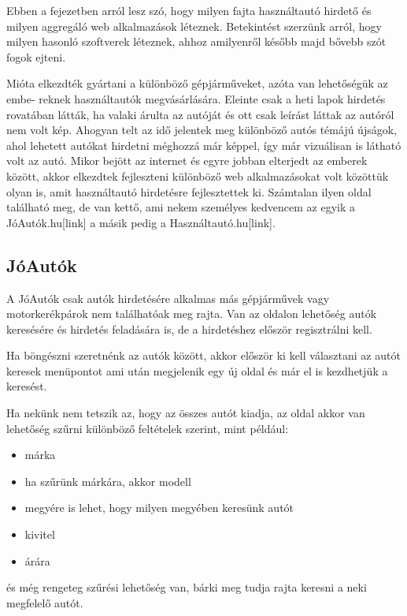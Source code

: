 
Ebben a fejezetben arról lesz szó, hogy milyen fajta használtautó hirdető és milyen aggregáló web alkalmazások léteznek. Betekintést szerzünk arról, hogy milyen hasonló szoftverek léteznek, ahhoz amilyenről később majd bővebb szót fogok ejteni.


Mióta elkezdték gyártani a különböző gépjárműveket, azóta van lehetőségük az embe-
reknek használtautók megvásárlására. Eleinte csak a heti lapok hirdetés rovatában látták, ha valaki árulta az autóját és ott csak leírást láttak az autóról nem volt kép. Ahogyan telt az idő jelentek meg különböző autós témájú újságok, ahol lehetett autókat hirdetni méghozzá már képpel, így már vizuálisan is látható volt az autó. 
Mikor bejött az internet és egyre jobban elterjedt az emberek között, akkor elkezdtek fejleszteni különböző web alkalmazásokat volt közöttük olyan is, amit használtautó hirdetésre fejlesztettek ki. Számtalan ilyen oldal található meg, de van kettő, ami nekem személyes kedvencem az egyik a JóAutók.hu[link] a másik pedig a Használtautó.hu[link].

\subsection{JóAutók}
A JóAutók csak autók hirdetésére alkalmas más gépjárművek vagy motorkerékpárok nem találhatóak meg rajta. Van az oldalon lehetőség autók keresésére és hirdetés feladására is, de a hirdetéshez először regisztrálni kell.

Ha böngészni szeretnénk az autók között, akkor először ki kell választani az autót keresek menüpontot ami után megjelenik egy új oldal és már el is kezdhetjük a keresést.

Ha nekünk nem tetszik az, hogy az összes autót kiadja, az oldal akkor van lehetőség szűrni különböző feltételek szerint, mint például:
\begin{itemize}
\item márka
\item ha szűrünk márkára, akkor modell
\item megyére is lehet, hogy milyen megyében keresünk autót
\item kivitel
\item árára
\end{itemize}

és még rengeteg szűrési lehetőség van, bárki meg tudja rajta keresni a neki megfelelő autót.

